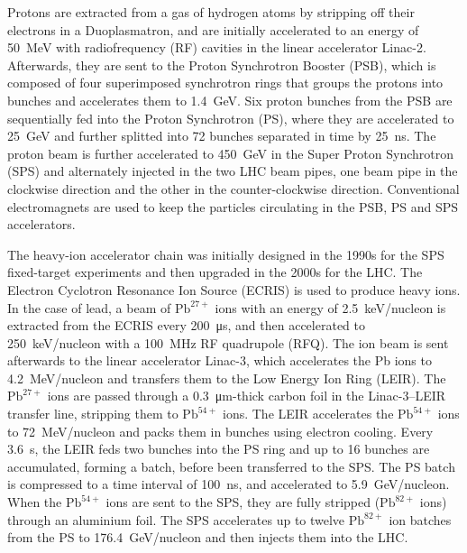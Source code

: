 Protons are extracted from a gas of hydrogen atoms by stripping off their electrons in a Duoplasmatron, and are initially accelerated to an energy of \SI{50}{\MeV} with radiofrequency (RF) cavities in the linear accelerator Linac-2. Afterwards, they are sent to the Proton Synchrotron Booster (PSB), which is composed of four superimposed synchrotron rings that groups the protons into bunches and accelerates them to \SI{1.4}{\GeV}. Six proton bunches from the PSB are sequentially fed into the Proton Synchrotron (PS), where they are accelerated to \SI{25}{\GeV} and further splitted into 72 bunches separated in time by \SI{25}{\ns}. The proton beam is further accelerated to \SI{450}{\GeV} in the Super Proton Synchrotron (SPS) and alternately injected in the two LHC beam pipes, one beam pipe in the clockwise direction and the other in the counter-clockwise direction. Conventional electromagnets are used to keep the particles circulating in the PSB, PS and SPS accelerators.

The heavy-ion accelerator chain was initially designed in the 1990s for the SPS fixed-target experiments and then upgraded in the 2000s for the LHC. The Electron Cyclotron Resonance Ion Source (ECRIS) is used to produce heavy ions. In the case of lead, a beam of $\mathrm{Pb}^{27+}$ ions with an energy of 2.5~\si{\keV}/nucleon is extracted from the ECRIS every \SI{200}{\us}, and then accelerated to \SI{250}{\keV}/nucleon with a \SI{100}{\MHz} RF quadrupole (RFQ). The ion beam is sent afterwards to the linear accelerator Linac-3, which accelerates the Pb ions to \SI{4.2}{\MeV}/nucleon and transfers them to the Low Energy Ion Ring (LEIR). The $\mathrm{Pb}^{27+}$ ions are passed through a \SI{0.3}{\um}-thick carbon foil in the Linac-3--LEIR transfer line, stripping them to $\mathrm{Pb}^{54+}$ ions. The LEIR accelerates the $\mathrm{Pb}^{54+}$ ions to \SI{72}{\MeV}/nucleon and packs them in bunches using electron cooling. Every 3.6~s, the LEIR feds two bunches into the PS ring and up to 16 bunches are accumulated, forming a batch, before been transferred to the SPS. The PS batch is compressed to a time interval of \SI{100}{\ns}, and accelerated to \SI{5.9}{\GeV}/nucleon. When the $\mathrm{Pb}^{54+}$ ions are sent to the SPS, they are fully stripped ($\mathrm{Pb}^{82+}$ ions) through an aluminium foil. The SPS accelerates up to twelve $\mathrm{Pb}^{82+}$ ion batches from the PS to \SI{176.4}{\GeV}/nucleon and then injects them into the LHC.

